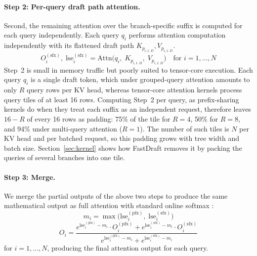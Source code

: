 \documentclass{article}
\begin{document}
\paragraph{Step 2: Per-query draft path attention.}
Second, the remaining attention over the branch-specific suffix is computed for each query independently.
Each query $q_i$ performs attention computation independently with its flattened draft path
$K_{p_{i,1:D}}, V_{p_{i,1:D}}$.
\begin{equation}
  O_i^{(\mathrm{sfx})},\; \mathrm{lse}_i^{(\mathrm{sfx})}
  = \mathrm{Attn}\!\bigl(q_i,\; K_{p_{i,1:D}},\; V_{p_{i,1:D}}\bigr)
  \quad \text{for } i = 1, \ldots, N
  \label{eq:draft_output}
\end{equation}
Step~2 is small in memory traffic but poorly suited to tensor-core execution. Each query $q_i$ is a single draft token, which under grouped-query attention amounts to only $R$ query rows per KV head, whereas tensor-core attention kernels process query tiles of at least 16 rows. Computing Step~2 per query, as prefix-sharing kernels do when they treat each suffix as an independent request, therefore leaves $16-R$ of every 16 rows as padding: 75\% of the tile for $R{=}4$, 50\% for $R{=}8$, and 94\% under multi-query attention ($R{=}1$). The number of such tiles is $N$ per KV head and per batched request, so this padding grows with tree width and batch size. Section~\ref{sec:kernel} shows how FastDraft removes it by packing the queries of several branches into one tile.

\paragraph{Step 3: Merge.}
We merge the partial outputs of the above two steps to produce
the same mathematical output as full attention with standard online softmax \cite{milakov2018onlinenormalizercalculationsoftmax}:
\begin{equation}
  m_i = \max\bigl(\mathrm{lse}_i^{(\mathrm{pfx})},\; \mathrm{lse}_i^{(\mathrm{sfx})}\bigr)
  \label{eq:merge_max}
\end{equation}
\begin{equation}
  O_i = \frac{
    e^{\mathrm{lse}_i^{(\mathrm{pfx})} - m_i} \cdot O_i^{(\mathrm{pfx})}
    + e^{\mathrm{lse}_i^{(\mathrm{sfx})} - m_i} \cdot O_i^{(\mathrm{sfx})}
  }{
    e^{\mathrm{lse}_i^{(\mathrm{pfx})} - m_i} + e^{\mathrm{lse}_i^{(\mathrm{sfx})} - m_i}
  }
  \label{eq:merge}
\end{equation}
for $i = 1, \ldots, N$, producing the final attention output for each query.
\end{document}
